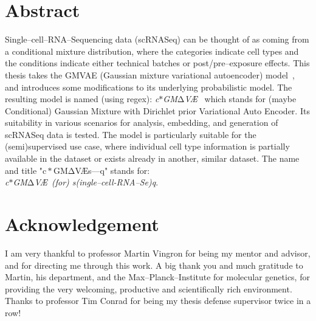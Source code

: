 \documentclass[11pt, a4paper]{report}
\theoremstyle{plain}
\theoremstyle{definition}
\theoremstyle{remark}
\newcommand{\scgmvae}{$\mathrm{c}{\ast}\mathrm{GM\Delta}$V{\AE}s---q}
\newcommand{\gmvae}{c$\ast$GM$\mathrm{\Delta}$V\AE~}
\begin{document}



\chapter*{Abstract}
Single--cell--RNA--Sequencing data (scRNASeq) can be thought of as coming from a conditional mixture distribution, where
the categories indicate cell types and the conditions indicate either technical
batches or post/pre--exposure effects.
This thesis takes
the GMVAE (Gaussian mixture variational autoencoder) model~\cite{dilokthanakul2016deep},
and introduces some modifications to its underlying probabilistic model. 
The resulting model is named (using regex): \emph{\gmvae} which stands for
(maybe Conditional) Gaussian Mixture with Dirichlet
prior Variational Auto Encoder.
Its suitability in various scenarios for analysis, embedding, and generation of scRNASeq
data is tested.
The model is particularly suitable for the (semi)supervised use case,
where individual cell type information is partially available
in the dataset or exists already in another, similar dataset.
The name and title "\scgmvae" stands for:\\ 
\emph{\gmvae (for) s(ingle--cell-RNA--Se)q}.



\chapter*{Acknowledgement}

I am very thankful to professor Martin Vingron for being my mentor and advisor,
and for directing me through this work. A big thank you and much gratitude to
Martin, his department, and the Max--Planck--Institute for molecular genetics,
for providing the very welcoming, productive and scientifically rich
environment. Thanks to professor Tim Conrad for being my thesis defense
supervisor twice in a row!
\end{document}
